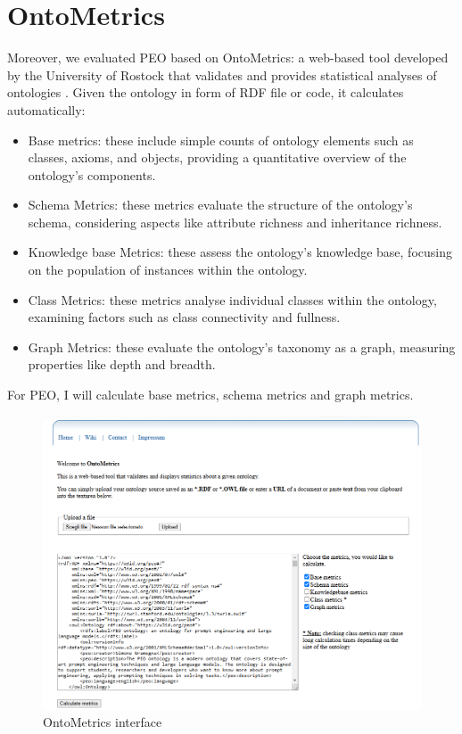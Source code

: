 \section{OntoMetrics}
\label{section:5_2_ontometrics}
Moreover, we evaluated PEO based on OntoMetrics: a web-based tool developed by the University of Rostock that validates and provides statistical analyses of ontologies \cite{lantow2016ontometrics}.
Given the ontology in form of RDF file or code, it calculates automatically:
\begin{itemize}
    \item Base metrics: these include simple counts of ontology elements such as classes, axioms, and objects, providing a quantitative overview of the ontology's components.

    \item Schema Metrics: these metrics evaluate the structure of the ontology's schema, considering aspects like attribute richness and inheritance richness.

    \item Knowledge base Metrics: these assess the ontology's knowledge base, focusing on the population of instances within the ontology.

    \item Class Metrics: these metrics analyse individual classes within the ontology, examining factors such as class connectivity and fullness.

    \item Graph Metrics: these evaluate the ontology's taxonomy as a graph, measuring properties like depth and breadth.
\end{itemize}
For PEO, I will calculate base metrics, schema metrics and graph metrics.
\begin{figure}[H]
    \centering
    \includegraphics[width=0.9\linewidth]{Figures/fig_41.png}
    \caption{OntoMetrics interface}
    \label{fig:enter-label}
\end{figure}

